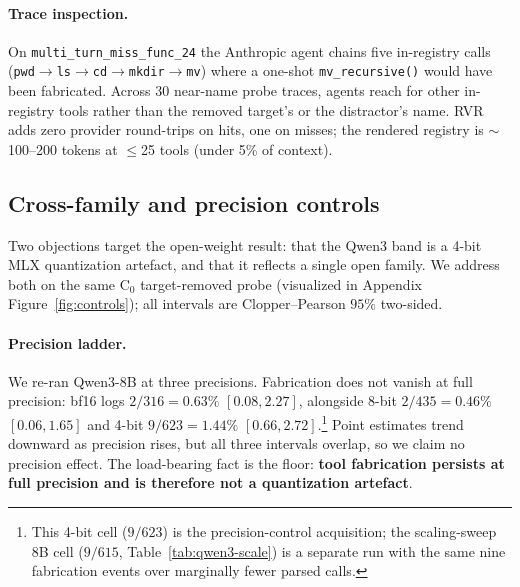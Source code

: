 \paragraph{Trace inspection.}
\label{sec:results:trace-inspection}
On \texttt{multi\_turn\_miss\_func\_24} the Anthropic agent chains
five in-registry calls
(\texttt{pwd}$\!\to\!$\texttt{ls}$\!\to\!$\texttt{cd}$\!\to\!$\texttt{mkdir}$\!\to\!$\texttt{mv})
where a one-shot \texttt{mv\_recursive()} would have been fabricated.
Across $30$ near-name probe traces, agents reach for other in-registry
tools rather than the removed target's or the distractor's name. RVR
adds zero provider round-trips on hits, one on misses; the rendered
registry is $\sim$100--200 tokens at $\leq$25 tools (under 5\% of context).

\subsection{Cross-family and precision controls}
\label{sec:results:controls}

Two objections target the open-weight result: that the Qwen3 band is a
4-bit MLX quantization artefact, and that it reflects a single open
family. We address both on the same $\mathrm{C}_0$ target-removed probe
(visualized in Appendix Figure~\ref{fig:controls}); all intervals are
Clopper--Pearson $95\%$ two-sided.

\paragraph{Precision ladder.} We re-ran Qwen3-8B at three precisions.
Fabrication does not vanish at full precision: bf16 logs $2/316=0.63\%$
$[0.08, 2.27]$, alongside 8-bit $2/435=0.46\%$ $[0.06, 1.65]$ and 4-bit
$9/623=1.44\%$ $[0.66, 2.72]$.\footnote{This 4-bit cell ($9/623$) is the
precision-control acquisition; the scaling-sweep 8B cell ($9/615$,
Table~\ref{tab:qwen3-scale}) is a separate run with the same nine
fabrication events over marginally fewer parsed calls.} Point estimates
trend downward as precision rises, but all three intervals overlap, so we
claim no precision effect. The load-bearing fact is the floor:
\textbf{tool fabrication persists at full precision and is therefore not a
quantization artefact}.

